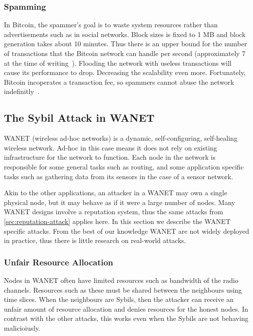 \subsubsection{Spamming}
In Bitcoin, the spammer's goal is to waste system resources rather than
advertisements such as in social networks. Block sizes is fixed to 1 MB and
block generation takes about 10 minutes. Thus there is an upper bound for the
number of transactions that the Bitcoin network can handle per second
(approximately 7 at the time of writing~\cite{bitcointps}). Flooding the network
with useless transactions will cause its performance to drop. Decreasing the
scalability even more. Fortunately, Bitcoin incoperates a transaction fee, so
spammers cannot abuse the network indefinitly~\cite{bitcoinspam}.

\subsection{The Sybil Attack in WANET}
WANET (wireless ad-hoc networks) is a dynamic, self-configuring, self-healing
wireless network. Ad-hoc in this case means it does not rely on existing
infrastructure for the network to function. Each node in the network is
responsible for some general tasks such as routing, and some application
specific tasks such as gathering data from its sensors in the case of a sensor
network.

Akin to the other applications, an attacker in a WANET may own a single physical
node, but it may behave as if it were a large number of nodes. Many WANET
designs involve a reputation system\cite{ganeriwal2008reputation,
  buchegger2003robust}, thus the same attacks from
\autoref{sec:reputation-attack} applies here. In this section we describe the
WANET specific attacks. From the best of our knowledge WANET are not widely
deployed in practice, thus there is little research on real-world attacks.

\subsubsection{Unfair Resource Allocation}
Nodes in WANET often have limited resources such as bandwidth of the radio
channels. Resources such as these must be shared between the neighbours using
time slices. When the neighbours are Sybils, then the attacker can receive an
unfair amount of resource allocation and denies resources for the honest
nodes\cite{newsome2004sybil}. In contrast with the other attacks, this works
even when the Sybils are not behaving malicioiusly.

